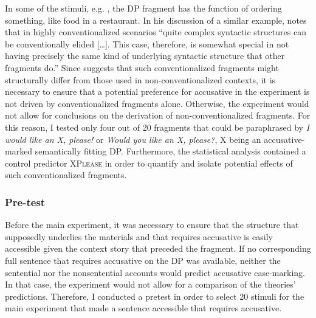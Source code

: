 In some of the stimuli, e.g. \Last, the DP fragment has the function of ordering something, like food in a restaurant. In his discussion of a similar example, \citet[731]{merchant2004} notes that in highly conventionalized scenarios ``quite complex syntactic structures can be conventionally elided [\dots]. This case, therefore, is somewhat special in not having precisely the same kind of underlying syntactic structure that other fragments do.'' Since \citeauthor{merchant2004} suggests that such conventionalized fragments might structurally differ from those used in non-conventionalized contexts, it is necessary to ensure that a potential preference for accusative in the experiment is not driven by conventionalized fragments alone. Otherwise, the experiment would not allow for conclusions on the derivation of non-conventionalized fragments. For this reason, I tested only four out of 20 fragments that could be paraphrased by \textit{I would like an X, please!} or \textit{Would you like an X, please?}, X being an accusative-marked semantically fitting DP. Furthermore, the statistical analysis contained a control predictor \textsc{XPlease} in order to quantify and isolate potential effects of such conventionalized fragments.

\subsubsection{Pre-test}
\label{sec:case-pretest}

Before the main experiment, it was necessary to ensure that the structure that supposedly underlies the materials and that requires accusative is easily accessible given the context story that preceded the fragment. If no corresponding full sentence that requires accusative on the DP was available, neither the sentential nor the nonsentential accounts would predict accusative case-marking. In that case, the experiment would not allow for a comparison of the theories' predictions. Therefore, I conducted a pretest in order to select 20 stimuli for the main experiment that made a sentence accessible that requires accusative.

